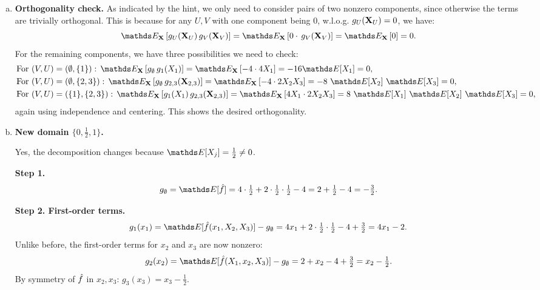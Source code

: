 {\begin{enumerate}[a)]
\textbf{Step 4. Third‐order term.}
\[
g_{1,2,3}(x_1,x_2,x_3)
= \fh(x_1,x_2,x_3)
- \sum_{V\subsetneq\{1,2,3\}} g_V(x_V)
= \underbrace{4 x_1 + 2x_2x_3 - 4}_{=\fh(x_1,x_2,x_3)}
- \Bigl( \underbrace{- 4}_{=g_\emptyset} + \underbrace{4x_1}_{=g_1(x_1)} + \underbrace{2x_2x_3}_{=g_{2,3}(x_2,x_3)} \Bigr)
=0.
\]
So, all in all, we only have three nonzero components in the fANOVA, which are exactly equal to the terms in the given equation that we would expect:
\[
    g_\emptyset = -4, \quad
    g_1 = 4 x_1, \quad
    g_{2,3} = 2 x_2 x_3.
\]

\item 
\textbf{Orthogonality check.}
As indicated by the hint, we only need to consider pairs of two nonzero components, since otherwise the terms are trivially orthogonal.
This is because for any $U, V$ with one component being 0, w.l.o.g. $g_U(\mathbf{X}_U) = 0$, we have:
\[
\E_\Xv \left[ g_U(\Xv_U) \, g_V(\Xv_V) \right]
= \E_\Xv \left[ 0 \cdot \, g_V(\Xv_V) \right]
= \E_\Xv \left[ 0 \right] = 0.
\]
For the remaining components, we have three possibilities we need to check:
\begin{align*}
    & \text{For } (V,U) = (\emptyset, \{1\}): 
    \, \E_\Xv \left[ g_\emptyset \, g_1(X_1) \right]
    = \E_\Xv \left[ -4 \cdot 4 X_1 \right]
    = -16 \E [X_1] = 0, \\
    & \text{For } (V,U) = (\emptyset, \{2,3\}): 
    \, \E_\Xv \left[ g_\emptyset \, g_{2,3}(\Xv_{2,3}) \right]
    = \E_\Xv \left[ -4 \cdot 2 X_2 X_3 \right]
    = -8 \ \E [X_2] \ \E [X_3] = 0, \\
    & \text{For } (V,U) = (\{1\}, \{2,3\}): 
    \, \E_\Xv \left[ g_1(X_1) \, g_{2,3}(\Xv_{2,3}) \right]
    = \E_\Xv \left[ 4 X_1 \cdot 2 X_2 X_3 \right]
    = 8 \ \E [X_1] \ \E [X_2] \ \E [X_3] = 0,
\end{align*}
again using independence and centering. This shows the desired orthogonality.

\item
\textbf{New domain $\{0, \tfrac12, 1\}$.}

Yes, the decomposition changes because $\E[X_j] = \tfrac12 \neq 0$.

\textbf{Step 1.}
\[
g_\emptyset = \E[\fh] = 4 \cdot \tfrac12 + 2 \cdot \tfrac12 \cdot \tfrac12 - 4 = 2 + \tfrac12 - 4 = -\tfrac32.
\]

\textbf{Step 2. First-order terms.}
\[
g_1(x_1) = \E[\fh(x_1, X_2, X_3)] - g_\emptyset
= 4x_1 + 2 \cdot \tfrac12 \cdot \tfrac12 - 4 + \tfrac32
= 4x_1 - 2.
\]
Unlike before, the first-order terms for $x_2$ and $x_3$ are now nonzero:
\[
g_2(x_2) = \E[\fh(X_1, x_2, X_3)] - g_\emptyset
= 2 + x_2 - 4 + \tfrac32
= x_2 - \tfrac12.
\]
By symmetry of $\hat{f}$ in $x_2, x_3$: $g_3(x_3) = x_3 - \tfrac12$.


\end{enumerate}}
